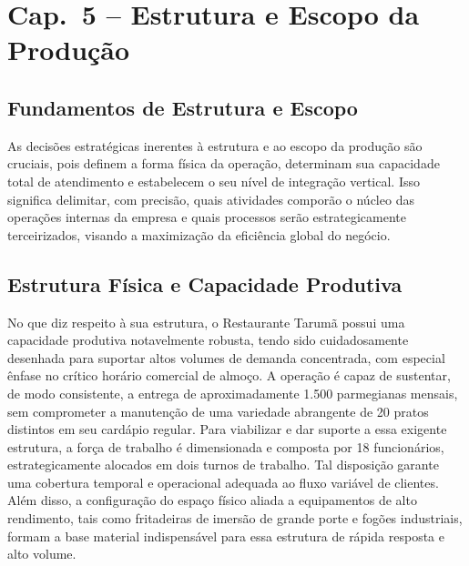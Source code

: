 \documentclass[12pt, a4paper]{article}
\begin{document}
\section{Cap.~5 – Estrutura e Escopo da Produção}

\subsection{Fundamentos de Estrutura e Escopo}
As decisões estratégicas inerentes à estrutura e ao escopo da produção são cruciais, pois definem a forma física da operação, determinam sua capacidade total de atendimento e estabelecem o seu nível de integração vertical. Isso significa delimitar, com precisão, quais atividades comporão o núcleo das operações internas da empresa e quais processos serão estrategicamente terceirizados, visando a maximização da eficiência global do negócio.

\subsection{Estrutura Física e Capacidade Produtiva}
No que diz respeito à sua estrutura, o Restaurante Tarumã possui uma capacidade produtiva notavelmente robusta, tendo sido cuidadosamente desenhada para suportar altos volumes de demanda concentrada, com especial ênfase no crítico horário comercial de almoço. A operação é capaz de sustentar, de modo consistente, a entrega de aproximadamente 1.500 parmegianas mensais, sem comprometer a manutenção de uma variedade abrangente de 20 pratos distintos em seu cardápio regular. Para viabilizar e dar suporte a essa exigente estrutura, a força de trabalho é dimensionada e composta por 18 funcionários, estrategicamente alocados em dois turnos de trabalho. Tal disposição garante uma cobertura temporal e operacional adequada ao fluxo variável de clientes. Além disso, a configuração do espaço físico aliada a equipamentos de alto rendimento, tais como fritadeiras de imersão de grande porte e fogões industriais, formam a base material indispensável para essa estrutura de rápida resposta e alto volume.
\end{document}
